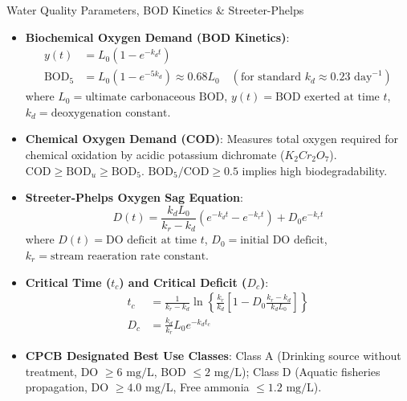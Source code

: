 \begin{formulabox}{Water Quality Parameters, BOD Kinetics \& Streeter-Phelps}
\begin{itemize}[leftmargin=1.2em]
    \item \textbf{Biochemical Oxygen Demand (BOD Kinetics)}:
    \begin{align}
    y(t) &= L_0(1 - e^{-k_d t}) \\
    \text{BOD}_5 &= L_0(1 - e^{-5 k_d}) \approx 0.68 L_0 \quad (\text{for standard } k_d \approx 0.23\text{ day}^{-1})
    \end{align}
    where $L_0 = \text{ultimate carbonaceous BOD}$, $y(t) = \text{BOD exerted at time } t$, $k_d = \text{deoxygenation constant}$.
    \item \textbf{Chemical Oxygen Demand (COD)}: Measures total oxygen required for chemical oxidation by acidic potassium dichromate ($K_2Cr_2O_7$). $\text{COD} \ge \text{BOD}_u \ge \text{BOD}_5$. $\text{BOD}_5 / \text{COD} \ge 0.5$ implies high biodegradability.
    \item \textbf{Streeter-Phelps Oxygen Sag Equation}:
    \begin{equation}
    D(t) = \frac{k_d L_0}{k_r - k_d} \left( e^{-k_d t} - e^{-k_r t} \right) + D_0 e^{-k_r t}
    \end{equation}
    where $D(t) = \text{DO deficit at time } t$, $D_0 = \text{initial DO deficit}$, $k_r = \text{stream reaeration rate constant}$.
    \item \textbf{Critical Time ($t_c$) and Critical Deficit ($D_c$)}:
    \begin{align}
    t_c &= \frac{1}{k_r - k_d} \ln\left\{ \frac{k_r}{k_d} \left[ 1 - D_0 \frac{k_r - k_d}{k_d L_0} \right] \right\} \\
    D_c &= \frac{k_d}{k_r} L_0 e^{-k_d t_c}
    \end{align}
    \item \textbf{CPCB Designated Best Use Classes}: Class A (Drinking source without treatment, DO $\ge 6\text{ mg/L}$, BOD $\le 2\text{ mg/L}$); Class D (Aquatic fisheries propagation, DO $\ge 4.0\text{ mg/L}$, Free ammonia $\le 1.2\text{ mg/L}$).
\end{itemize}
\end{formulabox}

